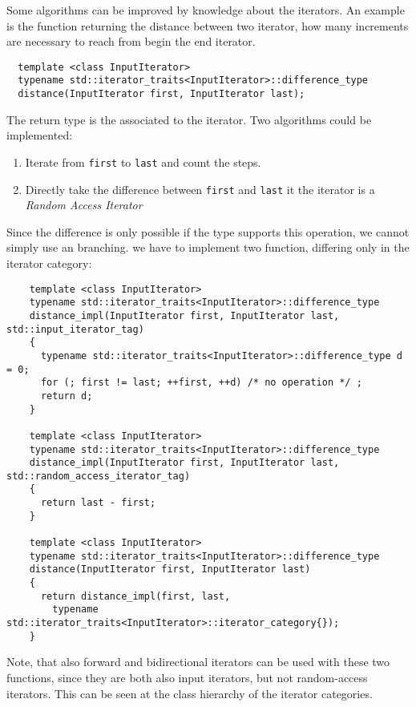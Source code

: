 \begin{example}
  Some algorithms can be improved by knowledge about the iterators. An example is the function  returning the distance
  between two iterator, \ie how many increments are necessary to reach from begin the end iterator.
  \begin{verbatim}
  template <class InputIterator>
  typename std::iterator_traits<InputIterator>::difference_type
  distance(InputIterator first, InputIterator last);
  \end{verbatim}

  The return type is the  associated to the iterator. Two algorithms could be implemented:
  \begin{enumerate}
    \item Iterate from \texttt{first} to \texttt{last} and count the steps.
    \item Directly take the difference between \texttt{first} and \texttt{last} it the iterator is a \emph{Random Access Iterator}
  \end{enumerate}

  Since the difference is only possible if the type supports this operation, we cannot simply use an  branching. we have
  to implement two function, differing only in the iterator category:
  \newpage
  \begin{verbatim}
    template <class InputIterator>
    typename std::iterator_traits<InputIterator>::difference_type
    distance_impl(InputIterator first, InputIterator last, std::input_iterator_tag)
    {
      typename std::iterator_traits<InputIterator>::difference_type d = 0;
      for (; first != last; ++first, ++d) /* no operation */ ;
      return d;
    }

    template <class InputIterator>
    typename std::iterator_traits<InputIterator>::difference_type
    distance_impl(InputIterator first, InputIterator last, std::random_access_iterator_tag)
    {
      return last - first;
    }

    template <class InputIterator>
    typename std::iterator_traits<InputIterator>::difference_type
    distance(InputIterator first, InputIterator last)
    {
      return distance_impl(first, last,
        typename std::iterator_traits<InputIterator>::iterator_category{});
    }
  \end{verbatim}

  Note, that also forward and bidirectional iterators can be used with these two functions, since they are both
  also input iterators, but not random-access iterators. This can be seen at the class hierarchy of the iterator
  categories.
\end{example}


